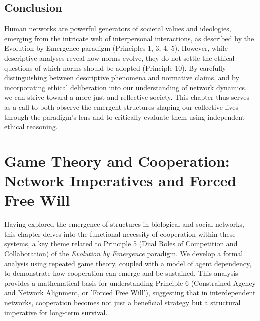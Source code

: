 \documentclass[12pt,openany]{book}
\let\cleardoublepage\clearpage %
\begin{document}
\section{Conclusion}
Human networks are powerful generators of societal values and ideologies, emerging from the intricate web of interpersonal interactions, as described by the Evolution by Emergence paradigm (Principles 1, 3, 4, 5). However, while descriptive analyses reveal how norms evolve, they do not settle the ethical questions of which norms should be adopted (Principle 10). By carefully distinguishing between descriptive phenomena and normative claims, and by incorporating ethical deliberation into our understanding of network dynamics, we can strive toward a more just and reflective society. This chapter thus serves as a call to both observe the emergent structures shaping our collective lives through the paradigm's lens and to critically evaluate them using independent ethical reasoning. %
\cleardoublepage

\chapter{Game Theory and Cooperation: Network Imperatives and Forced Free Will} %
\label{ch:GameTheory}

Having explored the emergence of structures in biological and social networks, this chapter delves into the functional necessity of cooperation within these systems, a key theme related to Principle 5 (Dual Roles of Competition and Collaboration) of the \emph{Evolution by Emergence} paradigm. We develop a formal analysis using repeated game theory, coupled with a model of agent dependency, to demonstrate how cooperation can emerge and be sustained. This analysis provides a mathematical basis for understanding Principle 6 (Constrained Agency and Network Alignment, or 'Forced Free Will'), suggesting that in interdependent networks, cooperation becomes not just a beneficial strategy but a structural imperative for long-term survival. %
\end{document}
